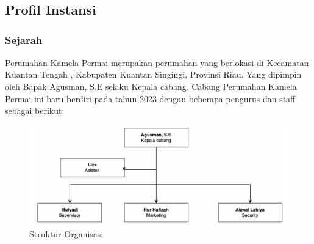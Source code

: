 




\chapter{\babDua}
\section{Profil Instansi}
\subsection{Sejarah}
Perumahan Kamela Permai merupakan perumahan yang berlokasi di Kecamatan Kuantan Tengah , Kabupaten Kuantan Singingi, Provinsi Riau. Yang dipimpin  oleh Bapak Agusman, S.E selaku Kepala cabang. Cabang Perumahan Kamela Permai ini baru berdiri pada tahun 2023 dengan beberapa pengurus dan staff sebagai berikut:

\begin{figure}
    \centering
    \includegraphics[width=0.75\linewidth]{Struktur Organisasi.png}
    \caption{Struktur Organisasi}
\end{figure}
